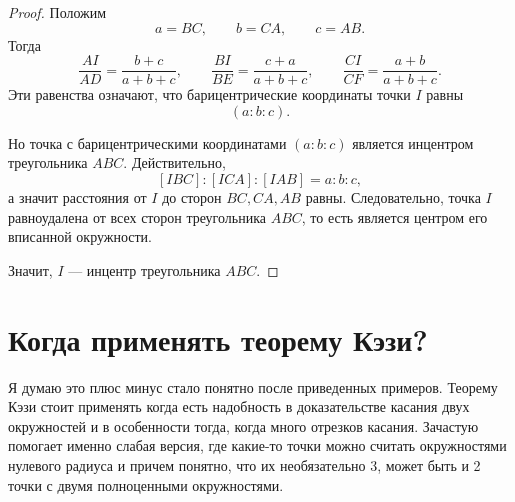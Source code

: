 \begin{proof}
Положим
\[
a=BC,\qquad b=CA,\qquad c=AB.
\]
Тогда
\[
\dfrac{AI}{AD}=\dfrac{b+c}{a+b+c},\qquad
\dfrac{BI}{BE}=\dfrac{c+a}{a+b+c},\qquad
\dfrac{CI}{CF}=\dfrac{a+b}{a+b+c}.
\]
Эти равенства означают, что барицентрические координаты точки $I$ равны
\[
(a:b:c).
\]

\newpage

\hspace{3mm}

Но точка с барицентрическими координатами $(a:b:c)$ является инцентром треугольника $ABC$. Действительно,
\[
[IBC]:[ICA]:[IAB]=a:b:c,
\]
а значит расстояния от $I$ до сторон $BC, CA, AB$ равны. Следовательно, точка $I$ равноудалена от всех сторон треугольника $ABC$, то есть является центром его вписанной окружности.

Значит, $I$ --- инцентр треугольника $ABC$.
\end{proof}
\section{Когда применять теорему Кэзи?}

Я думаю это плюс минус стало понятно после приведенных примеров. Теорему Кэзи стоит применять когда есть надобность в доказательстве касания двух окружностей и в особенности тогда, когда много отрезков касания. Зачастую помогает именно слабая версия, где какие-то точки можно считать окружностями нулевого радиуса и причем понятно, что их необязательно 3, может быть и 2 точки с двумя полноценными окружностями.